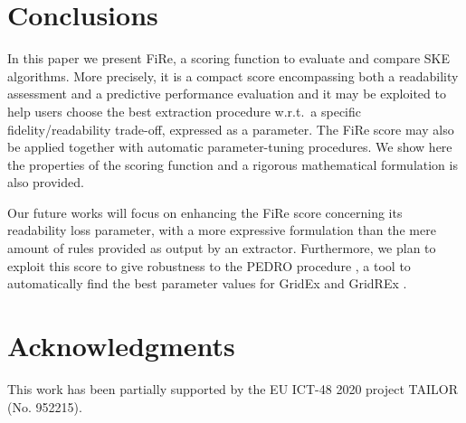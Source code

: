 \documentclass{article}
\newcommand{\gridex}{GridEx}
\newcommand{\gridrex}{GridREx}
\newcommand{\pedro}{\textsc{PEDRO}}
\newcommand{\fire}{FiRe}
\begin{document}
\section{Conclusions}\label{sec:conclusions}

In this paper we present \fire{}, a scoring function to evaluate and compare SKE algorithms.
%
More precisely, it is a compact score encompassing both a readability assessment and a predictive performance evaluation and it may be exploited to help users choose the best extraction procedure w.r.t.\ a specific fidelity/readability trade-off, expressed as a parameter.
%
The \fire{} score may also be applied together with automatic parameter-tuning procedures.
%
We show here the properties of the scoring function and a rigorous mathematical formulation is also provided.

Our future works will focus on enhancing the \fire{} score concerning its readability loss parameter, with a more expressive formulation than the mere amount of rules provided as output by an extractor.
%
Furthermore, we plan to exploit this score to give robustness to the \pedro{} procedure \cite{gridrex-kr2022}, a tool to automatically find the best parameter values for \gridex{} and \gridrex{} \cite{gridrex-kr2022}.

\section*{Acknowledgments}

This work has been partially supported by the EU ICT-48 2020 project TAILOR (No. 952215).




\end{document}
